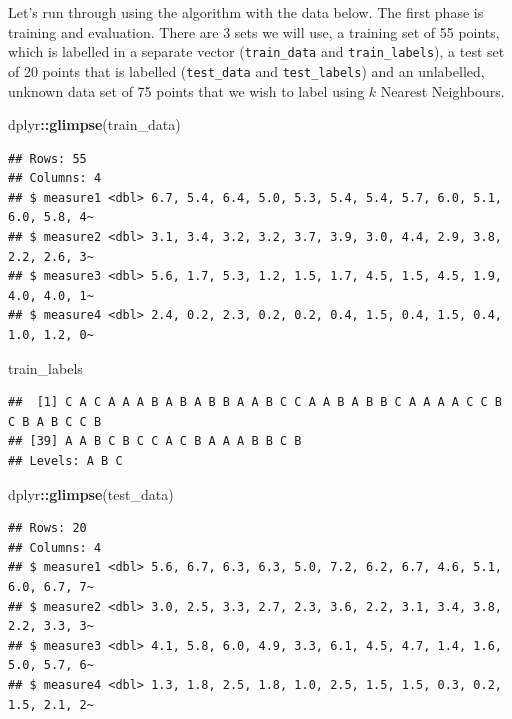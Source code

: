 \documentclass[
]{book}
\newenvironment{Shaded}{\begin{snugshade}}{\end{snugshade}}
\newcommand{\KeywordTok}[1]{\textcolor[rgb]{0.13,0.29,0.53}{\textbf{#1}}}
\newcommand{\NormalTok}[1]{#1}
\newcommand{\OperatorTok}[1]{\textcolor[rgb]{0.81,0.36,0.00}{\textbf{#1}}}
\begin{document}
Let's run through using the algorithm with the data below. The first phase is training and evaluation. There are 3 sets we will use, a training set of 55 points, which is labelled in a separate vector (\texttt{train\_data} and \texttt{train\_labels}), a test set of 20 points that is labelled (\texttt{test\_data} and \texttt{test\_labels}) and an unlabelled, unknown data set of 75 points that we wish to label using \(k\) Nearest Neighbours.

\begin{Shaded}
\begin{Highlighting}[]
\NormalTok{dplyr}\OperatorTok{::}\KeywordTok{glimpse}\NormalTok{(train_data)}
\end{Highlighting}
\end{Shaded}

\begin{verbatim}
## Rows: 55
## Columns: 4
## $ measure1 <dbl> 6.7, 5.4, 6.4, 5.0, 5.3, 5.4, 5.4, 5.7, 6.0, 5.1, 6.0, 5.8, 4~
## $ measure2 <dbl> 3.1, 3.4, 3.2, 3.2, 3.7, 3.9, 3.0, 4.4, 2.9, 3.8, 2.2, 2.6, 3~
## $ measure3 <dbl> 5.6, 1.7, 5.3, 1.2, 1.5, 1.7, 4.5, 1.5, 4.5, 1.9, 4.0, 4.0, 1~
## $ measure4 <dbl> 2.4, 0.2, 2.3, 0.2, 0.2, 0.4, 1.5, 0.4, 1.5, 0.4, 1.0, 1.2, 0~
\end{verbatim}

\begin{Shaded}
\begin{Highlighting}[]
\NormalTok{train_labels}
\end{Highlighting}
\end{Shaded}

\begin{verbatim}
##  [1] C A C A A A B A B A B B A A B C C A A B A B B C A A A A C C B C B A B C C B
## [39] A A B C B C C A C B A A A B B C B
## Levels: A B C
\end{verbatim}

\begin{Shaded}
\begin{Highlighting}[]
\NormalTok{dplyr}\OperatorTok{::}\KeywordTok{glimpse}\NormalTok{(test_data)}
\end{Highlighting}
\end{Shaded}

\begin{verbatim}
## Rows: 20
## Columns: 4
## $ measure1 <dbl> 5.6, 6.7, 6.3, 6.3, 5.0, 7.2, 6.2, 6.7, 4.6, 5.1, 6.0, 6.7, 7~
## $ measure2 <dbl> 3.0, 2.5, 3.3, 2.7, 2.3, 3.6, 2.2, 3.1, 3.4, 3.8, 2.2, 3.3, 3~
## $ measure3 <dbl> 4.1, 5.8, 6.0, 4.9, 3.3, 6.1, 4.5, 4.7, 1.4, 1.6, 5.0, 5.7, 6~
## $ measure4 <dbl> 1.3, 1.8, 2.5, 1.8, 1.0, 2.5, 1.5, 1.5, 0.3, 0.2, 1.5, 2.1, 2~
\end{verbatim}
\end{document}
